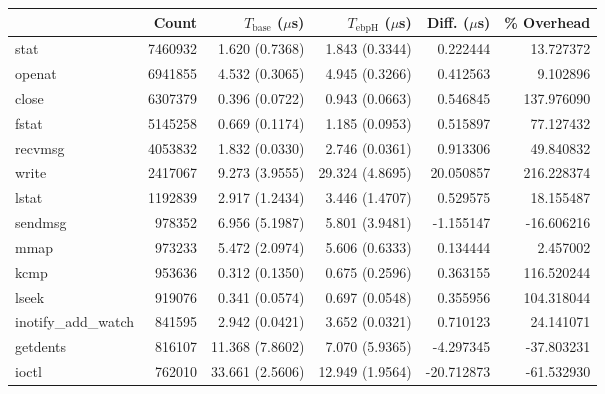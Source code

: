 \begin{tabular}{>{\ttfamily}lrrrrr}
\toprule
\multicolumn{1}{l}{System Call} &    Count & $T_\text{base}$ ($\mu$s) & $T_\text{ebpH}$ ($\mu$s) &  Diff. ($\mu$s) &  \% Overhead \\
\midrule
                           stat &  7460932 &           1.620 (0.7368) &           1.843 (0.3344) &        0.222444 &    13.727372 \\
                         openat &  6941855 &           4.532 (0.3065) &           4.945 (0.3266) &        0.412563 &     9.102896 \\
                          close &  6307379 &           0.396 (0.0722) &           0.943 (0.0663) &        0.546845 &   137.976090 \\
                          fstat &  5145258 &           0.669 (0.1174) &           1.185 (0.0953) &        0.515897 &    77.127432 \\
                        recvmsg &  4053832 &           1.832 (0.0330) &           2.746 (0.0361) &        0.913306 &    49.840832 \\
                          write &  2417067 &           9.273 (3.9555) &          29.324 (4.8695) &       20.050857 &   216.228374 \\
                          lstat &  1192839 &           2.917 (1.2434) &           3.446 (1.4707) &        0.529575 &    18.155487 \\
                        sendmsg &   978352 &           6.956 (5.1987) &           5.801 (3.9481) &       -1.155147 &   -16.606216 \\
                           mmap &   973233 &           5.472 (2.0974) &           5.606 (0.6333) &        0.134444 &     2.457002 \\
                           kcmp &   953636 &           0.312 (0.1350) &           0.675 (0.2596) &        0.363155 &   116.520244 \\
                          lseek &   919076 &           0.341 (0.0574) &           0.697 (0.0548) &        0.355956 &   104.318044 \\
            inotify\_add\_watch &   841595 &           2.942 (0.0421) &           3.652 (0.0321) &        0.710123 &    24.141071 \\
                       getdents &   816107 &          11.368 (7.8602) &           7.070 (5.9365) &       -4.297345 &   -37.803231 \\
                          ioctl &   762010 &          33.661 (2.5606) &          12.949 (1.9564) &      -20.712873 &   -61.532930 \\

\end{tabular}

